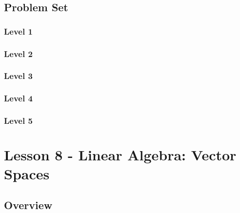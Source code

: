 \documentclass{article}
\begin{document}
\subsection{Problem Set}
\subsubsection{Level 1}
\subsubsection{Level 2}
\subsubsection{Level 3}
\subsubsection{Level 4}
\subsubsection{Level 5}
\pagebreak

\section{Lesson 8 - Linear Algebra: Vector Spaces}
\subsection{Overview}
\subsection{}
\begin{definition}
\end{definition}
\begin{definition}
\end{definition}
\begin{definition}
\end{definition}
\begin{definition}
\end{definition}
\begin{theorem}
\end{theorem}
\begin{theorem}
\end{theorem}
\subsection{}
\subsection{}
\end{document}
